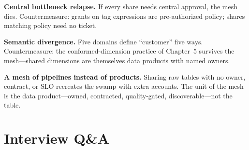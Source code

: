 \textbf{Central bottleneck relapse.} If every share needs central approval, the mesh dies. Countermeasure: grants on tag expressions are pre-authorized policy; shares matching policy need no ticket.

\textbf{Semantic divergence.} Five domains define ``customer'' five ways. Countermeasure: the conformed-dimension practice of Chapter~5 survives the mesh---shared dimensions are themselves data products with named owners.

\begin{pitfall}
\textbf{A mesh of pipelines instead of products.} Sharing raw tables with no owner, contract, or SLO recreates the swamp with extra accounts. The unit of the mesh is the data product---owned, contracted, quality-gated, discoverable---not the table.
\end{pitfall}

\section{Interview Q\&A}
